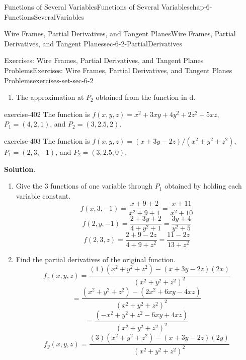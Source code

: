 \documentclass[oneside,10pt,]{book}
\numberwithin{equation}{section}
\begin{document}
\begin{chapterptx}{Functions of Several Variables}{}{Functions of Several Variables}{}{}{chap-6-FunctionsSeveralVariables}
\begin{sectionptx}{Wire Frames, Partial Derivatives, and Tangent Planes}{}{Wire Frames, Partial Derivatives, and Tangent Planes}{}{}{sec-6-2-PartialDerivatives}
\begin{exercises-subsection-numberless}{Exercises: Wire Frames, Partial Derivatives, and Tangent Planes Problems}{}{Exercises: Wire Frames, Partial Derivatives, and Tangent Planes Problems}{}{}{exercises-set-sec-6-2}
\begin{enumerate}[label=(\alph*)]
Give the equation of the linear approximating function through \(P_1\).%
\item\hypertarget{li-641}{}\hypertarget{p-2303}{}%
The approximation at \(P_2\) obtained from the function in d.%
\end{enumerate}
\begin{exercisegroup}
\begin{divisionexerciseeg}{8}{}{}{exercise-402}%
\hypertarget{p-2304}{}%
The function is \(f(x,y,z)=x^2+3xy+4y^2+2z^2+5xz\), \(P_1=(4,2,1)\), and \(P_2=(3,2.5,2)\).%
\end{divisionexerciseeg}%
\begin{divisionexerciseeg}{9}{}{}{exercise-403}%
\hypertarget{p-2305}{}%
The function is \(f(x,y,z)=(x+3y-2z)/(x^2+y^2+z^2 )\), \(P_1=(2,3,-1)\), and \(P_2=(3,2.5,0)\).%
\par\smallskip%
\noindent\textbf{Solution}.\hypertarget{solution-203}{}\quad%
\leavevmode%
\begin{enumerate}[label=(\alph*)]
\item\hypertarget{li-642}{}\hypertarget{p-2306}{}%
Give the 3 functions of one variable through \(P_1\) obtained by holding each variable constant.%
%
\begin{equation*}
f(x,3,-1)=\frac{x+9+2}{x^2+9+1}=\frac{x+11}{x^2+10}
\end{equation*}
%
\begin{equation*}
f(2,y,-1)=\frac{2+3y+2}{4+y^2+1}=\frac{3y+4}{y^2+5}
\end{equation*}
%
\begin{equation*}
f(2,3,z)=\frac{2+9-2z}{4+9+z^2 }=\frac{11-2z}{13+z^2 }
\end{equation*}
\item\hypertarget{li-643}{}\hypertarget{p-2307}{}%
Find the partial derivatives of the original function.%
%
\begin{equation*}
f_x  (x,y,z) =\frac{(1)(x^2+y^2+z^2 )-(x+3y-2z)(2x)}{(x^2+y^2+z^2 )^2} 
\end{equation*}
%
\begin{equation*}
=\frac{(x^2+y^2+z^2 )-(2x^2+6xy-4xz)}{(x^2+y^2+z^2 )^2 }  
\end{equation*}
%
\begin{equation*}
=\frac{(-x^2+y^2+z^2-6xy+4xz)}{(x^2+y^2+z^2 )^2} 
\end{equation*}
%
\begin{equation*}
f_y  (x,y,z)=\frac{(3)(x^2+y^2+z^2 )-(x+3y-2z)(2y)}{(x^2+y^2+z^2 )^2 } 
\end{equation*}
%
\begin{equation*}

\end{equation*}
\end{enumerate}
\end{divisionexerciseeg}
\end{exercisegroup}
\end{exercises-subsection-numberless}
\end{sectionptx}
\end{chapterptx}
\end{document}
